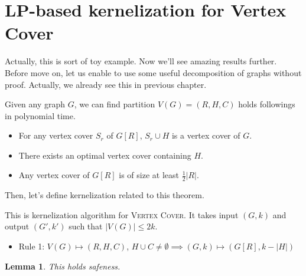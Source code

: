 \documentclass[12pt, a4paper, openany, twoside]{book}
\newtheorem{lem}[thm]{Lemma}
\theoremstyle{definition}
\theoremstyle{remark}
\newcommand{\CO}{{\mathcal {O}}} \newcommand{\CP}{{\mathcal {P}}}
\theoremstyle{plain}
\numberwithin{equation}{section}
\begin{document}
\newpage 

\section{LP-based kernelization for Vertex Cover}
Actually, this is sort of toy example. Now we'll see amazing results further. 
Before move on, let us enable to use some useful decomposition of graphs without proof. Actually, we already see this in previous chapter. 

\begin{tcolorbox}[colback=yellow!10!white,colframe=red!75!black,title=Nemhauser-Trotter Theorem,breakable]

Given any graph $G$, we can find partition $V(G) = (R, H, C)$ holds followings in polynomial time. 
\begin{itemize}
    \item For any vertex cover $S_r$ of $G[R]$, $S_r \cup H$ is a vertex cover of $G$. 
    \item There exists an optimal vertex cover containing $H$. 
    \item Any vertex cover of $G[R]$ is of size at least $\frac{1}{2}|R|$. 
\end{itemize}

\end{tcolorbox}

Then, let's define kernelization related to this theorem. 

\begin{tcolorbox}[colback=yellow!10!white,colframe=red!75!black,title=$\CO(2k)$-kernelization of Vertex Cover]

This is kernelization algorithm for \textsc{Vertex Cover}. It takes input $(G, k)$ and output $(G', k')$ such that 
$|V(G)| \leq 2k$. 

\begin{itemize}
    \item Rule 1: $V(G) \mapsto (R, H, C)$, $H \cup C \neq \emptyset \implies (G, k) \mapsto (G[R], k - |H|)$
\end{itemize}

\end{tcolorbox}

\begin{lem}
    This holds safeness. 
\end{lem}
\end{document}
